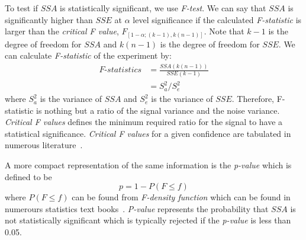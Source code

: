 To test if $\mathit{SSA}$ is statistically significant, we use
\emph{F-test}. We can say that $\mathit{SSA}$ is significantly higher
than $\mathit{SSE}$ at $\alpha$ level significance if the calculated
\emph{F-statistic} is larger than the \emph{critical F value},
$F_{[1-\alpha;(k-1),k(n-1)]}$. Note that $k-1$ is the degree of
freedom for $\mathit{SSA}$ and $k(n-1)$ is the degree of freedom for
$\mathit{SSE}$. We can calculate \emph{F-statistic} of the experiment
by:
\begin{equation}
\begin{split}
\textit{F-statistics}&=\frac{\mathit{SSA}(k(n-1))}{\mathit{SSE}(k-1)}\\
 &=S_a^2/S_e^2
\end{split}
\end{equation}
where $S_a^2$ is the variance of $\mathit{SSA}$ and $S_e^2$ is the
variance of $\mathit{SSE}$. Therefore, F-statistic is nothing but a ratio of the signal variance and the noise variance. \emph{Critical F values} defines the minimum required ratio for the signal to have a statistical significance.
\emph{Critical F values} for a given confidence are tabulated in numerous literature~\cite{lilja:2005}.

A more compact representation of the same information is the
\emph{p-value} which is defined to be
\begin{equation}
p=1-P(F\le f)
\end{equation}
where $P(F \le f)$ can be found from \emph{F-density function} which can
be found in numerours statistics text books~\cite{lilja:2005}.
\emph{P-value} represents the probability that $SSA$ is not statistically
significant which is typically rejected if the \emph{p-value} is less
than 0.05.
